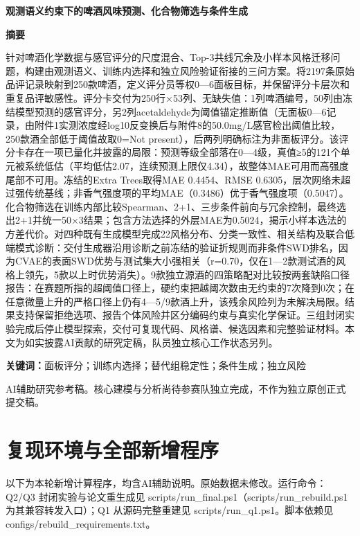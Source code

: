 \documentclass[UTF8,a4paper,zihao=-4]{ctexart}
\begin{document}
\begin{center}{\bfseries 观测语义约束下的啤酒风味预测、化合物筛选与条件生成}\end{center}
\begin{center}\textbf{摘要}\end{center}
针对啤酒化学数据与感官评分的尺度混合、Top-3共线冗余及小样本风格迁移问题，构建由观测语义、训练内选择和独立风险验证衔接的三问方案。将2197条原始品评记录映射到250款啤酒，定义评分员等权0—6面板目标，并保留评分卡层次和重复品评敏感性。评分卡交付为250行×53列、无缺失值：1列啤酒编号，50列由冻结模型预测的感官评分，另2列acetaldehyde为阈值锚定推断值（无面板0—6记录，由附件1实测浓度经log10反变换后与附件8的50.0mg/L感官检出阈值比较，250款酒全部低于阈值故取0=Not present），后两列明确标注为非面板评分。该评分卡存在一项已量化并披露的局限：预测等级全部落在0—4级，真值≥5的121个单元被系统低估（平均低估2.07，连续预测上限仅4.34），故整体MAE可用而高强度尾部不可用。冻结的Extra Trees取得MAE 0.4454、RMSE 0.6305，层次网络未超过强传统基线；非香气强度项的平均MAE（0.3486）优于香气强度项（0.5047）。化合物筛选在训练内部比较Spearman、2+1、三步条件前向与冗余控制，最终选出2+1并统一50×3结果；包含方法选择的外层MAE为0.5024，揭示小样本选法的方差代价。对四种既有生成模型完成22风格分布、分类一致性、相关结构及联合低端模式诊断：交付生成器沿用诊断之前冻结的验证折规则而非条件SWD排名，因为CVAE的表面SWD优势与测试集大小强相关（r=0.70，仅在1—2款测试酒的风格上领先，5款以上时优势消失）。9款独立源酒的四策略配对比较按两套缺陷口径报告：在赛题所指的超阈值口径上，硬约束把越阈次数由无约束的7次降到0次；在任意微量上升的严格口径上仍有4—5/9款酒上升，该残余风险列为未解决局限。结果支持保留拒绝选项、报告个体风险并区分编码约束与真实化学保证。三组封闭实验完成后停止模型探索，交付可复现代码、风格谱、候选因素和完整验证材料。本文为如实披露AI贡献的研究定稿，队员独立核心工作状态另列。

\noindent\textbf{关键词：}面板评分；训练内选择；替代组稳定性；条件生成；独立风险

\vfill\noindent\small AI辅助研究参考稿。核心建模与分析尚待参赛队独立完成，不作为独立原创正式提交稿。
\newpage\normalsize\tableofcontents\newpage
{}

\clearpage\appendix

\section{复现环境与全部新增程序}
以下为本轮新增计算程序，均含AI辅助说明。原始数据未修改。运行命令：Q2/Q3 封闭实验与论文重生成见 scripts/run\_final.ps1（scripts/run\_rebuild.ps1 为其兼容转发入口）；Q1 从源码完整重建见 scripts/run\_q1.ps1。脚本依赖见 configs/rebuild\_requirements.txt。
\end{document}
